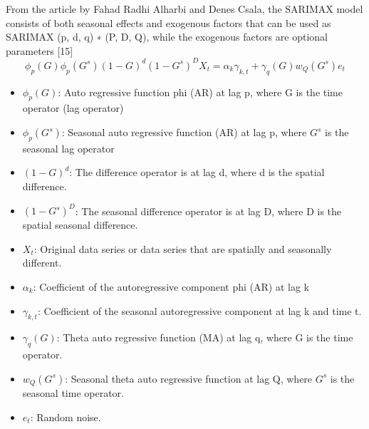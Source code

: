 \documentclass[conference]{IEEEtran}
\begin{document}
{From the article by Fahad Radhi Alharbi and Denes Csala, the SARIMAX model consists of both seasonal effects and exogenous factors that can be used as SARIMAX (p, d, q) ∗ (P, D, Q), while the exogenous factors are optional parameters [15]
\[\phi_p(G)\phi_p(G^s)(1 - G)^d(1 - G^s)^D X_t = \alpha_k \gamma_{k,t} + \gamma_q(G)w_Q(G^s)e_t\]
\begin{itemize}
    \item \(\phi_p(G)\): Auto regressive function phi (AR) at lag p, where G is the time operator (lag operator)
    \item \(\phi_p(G^s)\): Seasonal auto regressive function (AR) at lag p, where \(G^s\) is the seasonal lag operator
    \item \((1 - G)^d\): The difference operator is at lag d, where d is the spatial difference.
    \item \((1 - G^s)^D\): The seasonal difference operator is at lag D, where D is the spatial seasonal difference.
    \item \(X_t\): Original data series or data series that are spatially and seasonally different.
    \item \(\alpha_k\): Coefficient of the autoregressive component phi (AR) at lag k
    \item \(\gamma_{k,t}\): Coefficient of the seasonal autoregressive component at lag k and time t.
    \item \(\gamma_q(G)\): Theta auto regressive function (MA) at lag q, where G is the time operator.
    \item \(w_Q(G^s)\): Seasonal theta auto regressive function at lag Q, where \(G^s\) is the seasonal time operator.
    \item \(e_t\): Random noise.


\end{itemize}}
\end{document}
